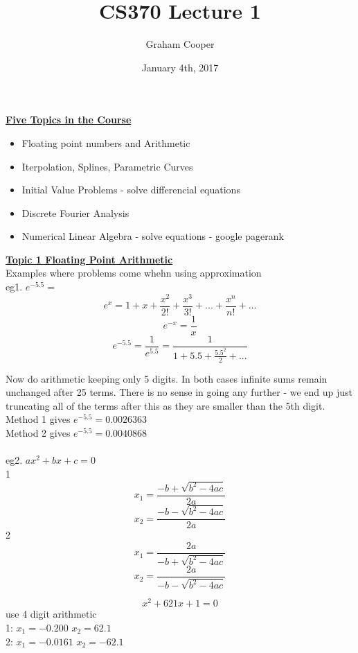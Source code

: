 \documentclass[12pt]{article}
\title{\vspace{-15ex}CS370 Lecture 1\vspace{-1ex}}
\date{January 4th, 2017}
\author{Graham Cooper}
\newcommand{\myt}[1]{\textbf{\underline{#1}}}
\begin{document}
	\maketitle
	\myt{Five Topics in the Course}
	\begin{itemize}
		\item Floating point numbers and Arithmetic
		\item Iterpolation, Splines, Parametric Curves
		\item Initial Value Problems - solve differencial equations
		\item Discrete Fourier Analysis
		\item Numerical Linear Algebra - solve equations - google pagerank
	\end{itemize}

	\myt{Topic 1 Floating Point Arithmetic}\\
	Examples where problems come whehn using approximation\\
	
	eg1. $e^{-5.5} = $\\
	
	$$e^x = 1 + x + \frac{x^2}{2!} + \frac{x^3}{3!} + ... + \frac{x^n}{n!} + ...$$
	$$e^{-x} = \frac{1}{x}$$
	$$e^{-5.5} = \frac{1}{e^{5.5}} = \frac{1}{1 + 5.5 + \frac{5.5^2}{2} + ...}$$
	
	Now do arithmetic keeping only 5 digits. In both cases infinite sums remain unchanged after 25 terms. There is no sense in going any further - we end up just truncating all of the terms after this as they are smaller than the 5th digit.\\
	
	Method 1 gives $e^{-5.5} = 0.0026363$\\
	Method 2 gives $e^{-5.5} = 0.0040868$\\\\
	
	eg2. $ax^2 + bx + c = 0$\\
	1
	$$x_1 = \frac{-b +\sqrt{b^2-4ac}}{2a}$$
	$$x_2 = \frac{-b -\sqrt{b^2-4ac}}{2a}$$
	2
	$$x_1 = \frac{2a}{-b +\sqrt{b^2-4ac}}$$
	$$x_2 = \frac{2a}{-b -\sqrt{b^2-4ac}}$$
	
	$$x^2 + 621x + 1 = 0$$
	use 4 digit arithmetic\\
	
	1: $x_1 = -0.200$ $x_2 = 62.1$\\
	2: $x_1 = -0.0161$ $x_2 = -62.1$\\
	
\end{document}
